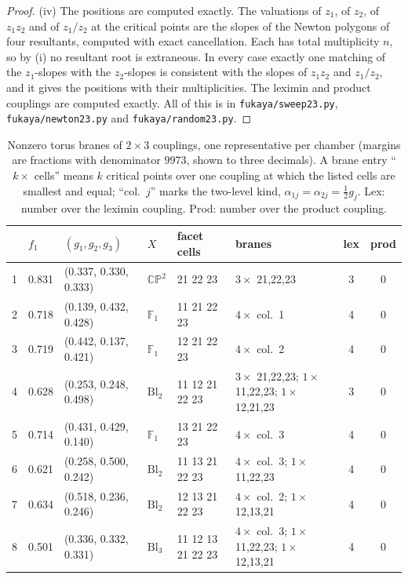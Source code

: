 \documentclass[11pt]{article}
\theoremstyle{definition}
\theoremstyle{remark}
\begin{document}
\begin{proof}
(iv) The positions are computed exactly. The valuations of $z_1$, of $z_2$, of $z_1z_2$ and of $z_1/z_2$ at the critical points are the slopes of
the Newton polygons of four resultants, computed with exact cancellation. Each has total multiplicity $n$, so by (i) no resultant root is
extraneous. In every case exactly one matching of the $z_1$-slopes with the $z_2$-slopes is consistent with the slopes of $z_1z_2$ and $z_1/z_2$,
and it gives the positions with their multiplicities. The leximin and product couplings are computed exactly. All of this is in
\texttt{fukaya/sweep23.py}, \texttt{fukaya/newton23.py} and \texttt{fukaya/random23.py}.
\end{proof}

\begin{table}[ht]
\centering\footnotesize\setlength{\tabcolsep}{3.5pt}
\caption{Nonzero torus branes of $2\times3$ couplings, one representative per chamber (margins are fractions with denominator $9973$, shown to three decimals). A brane entry ``$k\times$ cells'' means $k$ critical points over one coupling at which the listed cells are smallest and equal; ``col.~$j$'' marks the two-level kind, $\alpha_{1j}=\alpha_{2j}=\frac12g_j$. Lex: number over the leximin coupling. Prod: number over the product coupling.}\label{tab:sweep23}
\begin{tabular}{rlllllcc}
\toprule
& $f_1$ & $(g_1,g_2,g_3)$ & $X$ & facet cells & branes & lex & prod\\
\midrule
1 & 0.831 & (0.337, 0.330, 0.333) & $\mathbb{CP}^2$ & 21 22 23 & $3\times$ 21,22,23 & 3 & 0\\
2 & 0.718 & (0.139, 0.432, 0.428) & $\mathbb F_1$ & 11 21 22 23 & $4\times$ col.~1 & 4 & 0\\
3 & 0.719 & (0.442, 0.137, 0.421) & $\mathbb F_1$ & 12 21 22 23 & $4\times$ col.~2 & 4 & 0\\
4 & 0.628 & (0.253, 0.248, 0.498) & $\mathrm{Bl}_2$ & 11 12 21 22 23 & $3\times$ 21,22,23; $1\times$ 11,22,23; $1\times$ 12,21,23 & 3 & 0\\
5 & 0.714 & (0.431, 0.429, 0.140) & $\mathbb F_1$ & 13 21 22 23 & $4\times$ col.~3 & 4 & 0\\
6 & 0.621 & (0.258, 0.500, 0.242) & $\mathrm{Bl}_2$ & 11 13 21 22 23 & $4\times$ col.~3; $1\times$ 11,22,23 & 4 & 0\\
7 & 0.634 & (0.518, 0.236, 0.246) & $\mathrm{Bl}_2$ & 12 13 21 22 23 & $4\times$ col.~2; $1\times$ 12,13,21 & 4 & 0\\
8 & 0.501 & (0.336, 0.332, 0.331) & $\mathrm{Bl}_3$ & 11 12 13 21 22 23 & $4\times$ col.~3; $1\times$ 11,22,23; $1\times$ 12,13,21 & 4 & 0\\

\end{tabular}
\end{table}
\end{document}

